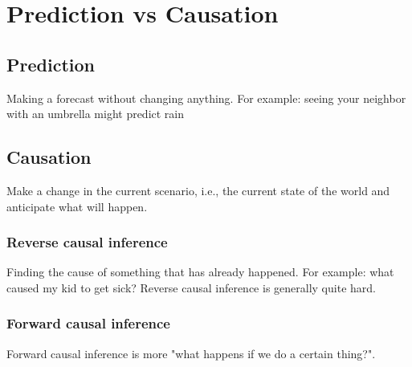 





% 



\section{Prediction vs Causation}
\subsection{Prediction}
Making a forecast without changing anything.
For example: seeing your neighbor with an umbrella might predict rain

\subsection{Causation}
Make a change in the current scenario, i.e., the current state of the world and anticipate what will happen.

\subsubsection{Reverse causal inference}
Finding the cause of something that has already happened.
For example: what caused my kid to get sick?
Reverse causal inference is generally quite hard.
\subsubsection{Forward causal inference}
Forward causal inference is more "what happens if we do a certain thing?".

